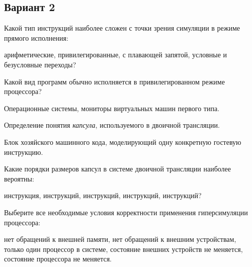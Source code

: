 \subsection*{Вариант 2}

\begin{questions}


\question[3] Какой тип инструкций наиболее сложен с точки зрения симуляции в режиме прямого исполнения:
\begin{choices}
    \choice арифметические,
    \correctchoice привилегированные,
    \choice с плавающей запятой,
    \choice условные и безусловные переходы?
\end{choices}

\question[3] Какой вид программ обычно исполняется в привилегированном режиме процессора?
\begin{solution}[1cm]
Операционные системы, мониторы виртуальных машин первого типа.
\end{solution}

\question[3] Определение понятия \emph{капсула}, используемого в двоичной трансляции.
\begin{solution}[1cm]
Блок хозяйского машинного кода, моделирующий одну конкретную гостевую инструкцию.
\end{solution}

\question[3] Какие порядки размеров капсул в системе двоичной трансляции наиболее вероятны:
\begin{choices}
     инструкция,
     инструкций,
     инструкций,
     инструкций,
     инструкций?
\end{choices}

\question[3] Выберите все необходимые условия корректности применения гиперсимуляции процессора:
\begin{choices}
    \correctchoice нет обращений к внешней памяти,
    \choice  нет обращений к внешним устройствам,
    \choice только один процессор в системе,
    \correctchoice состояние внешних устройств не меняется,
    \choice состояние процессора не меняется.
\end{choices}


\end{questions}


